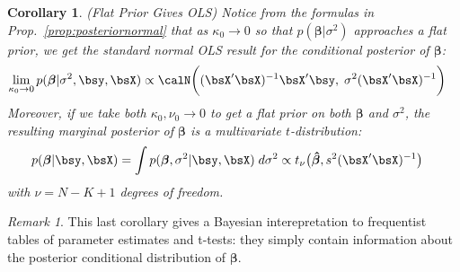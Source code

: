 \documentclass[12pt]{article}
\theoremstyle{plain}
\newtheorem{cor}[thm]{Corollary}
\theoremstyle{definition}
\theoremstyle{remark}
\newtheorem*{rmk}{Remark}
\newcommand{\ra}{\rightarrow}
\newcommand{\bsbeta}{\boldsymbol{\beta}}
\newcommand{\bshatbeta}{\boldsymbol{\hat{\beta}}}
\begin{document}
\begin{cor}\emph{(Flat Prior Gives OLS)}
\label{cor:flatpriorols}
Notice from the formulas in Prop.~\ref{prop:posteriornormal} that as
$\kappa_0\ra 0$ so that $p(\bsbeta|\sigma^2)$ approaches a flat prior,
we get the standard normal OLS result for the conditional posterior of
$\bsbeta$:
\begin{align*}
  \lim_{\kappa_0\ra 0}
  p(\bsbeta | \sigma^2, \bsy, \bsX)
  &\propto
  \calN\bigg(
  (\bsX'\bsX)^{-1}
  \bsX'\bsy,\;
  \sigma^2(\bsX'\bsX)^{-1}
  \bigg)
\end{align*}
Moreover, if we take both $\kappa_0,\nu_0\ra 0$ to get a flat prior on
both $\bsbeta$ and $\sigma^2$, the resulting marginal posterior of
$\bsbeta$ is a multivariate $t$-distribution:
\begin{align*}
  p(\bsbeta|\bsy,\bsX)
  &= \int p(\bsbeta,\sigma^2| \bsy,\bsX) \; d\sigma^2
  \propto
  t_\nu\big(\bshatbeta,s^2(\bsX'\bsX)^{-1}\big)
\end{align*}
with $\nu=N-K+1$ degrees of freedom.
\end{cor}
\begin{rmk}
This last corollary gives a Bayesian interepretation to frequentist
tables of parameter estimates and t-tests: they simply contain
information about the posterior conditional distribution of $\bsbeta$.
\end{rmk}
\end{document}
